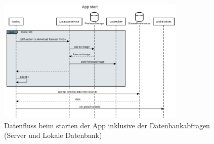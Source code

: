 \begin{figure}[h]
 \centering
 \includegraphics[width=0.8\textwidth,angle=0]{abb/sequence_diagram_app_start}
 \caption[Sequencediagram Appstart]{Datenfluss beim starten der App inklusive der Datenbankabfragen (Server und Lokale Datenbank)}
\label{fig:sequence_diagram_app_start}
\end{figure}

